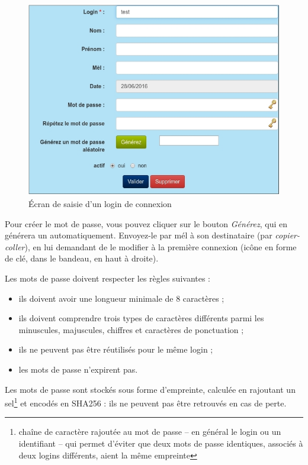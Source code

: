 \begin{figure}[H]
\includegraphics[width=\linewidth]{images/user_create}
\caption{Écran de saisie d'un login de connexion}
\end{figure}

Pour créer le mot de passe, vous pouvez cliquer sur le bouton \textit{Générez}, qui  en générera un automatiquement. Envoyez-le par mél à son destinataire (par \textit{copier-coller}), en lui demandant de le modifier à la première connexion (icône en forme de clé, dans le bandeau, en haut à droite).

Les mots de passe doivent respecter les règles suivantes :
\begin{itemize}
\item ils doivent avoir une longueur minimale de 8 caractères ;
\item ils doivent comprendre trois types de caractères différents parmi les minuscules, majuscules, chiffres et caractères de ponctuation ;
\item ils ne peuvent pas être réutilisés pour le même login ;
\item les mots de passe n'expirent pas.
\end{itemize}

Les mots de passe sont stockés sous forme d'empreinte, calculée en rajoutant un sel\footnote{chaîne de caractère rajoutée au mot de passe -- en général le login ou un identifiant -- qui permet d'éviter que deux mots de passe identiques, associés à deux logins différents, aient la même empreinte} et encodés en SHA256 : ils ne peuvent pas être retrouvés en cas de perte.

